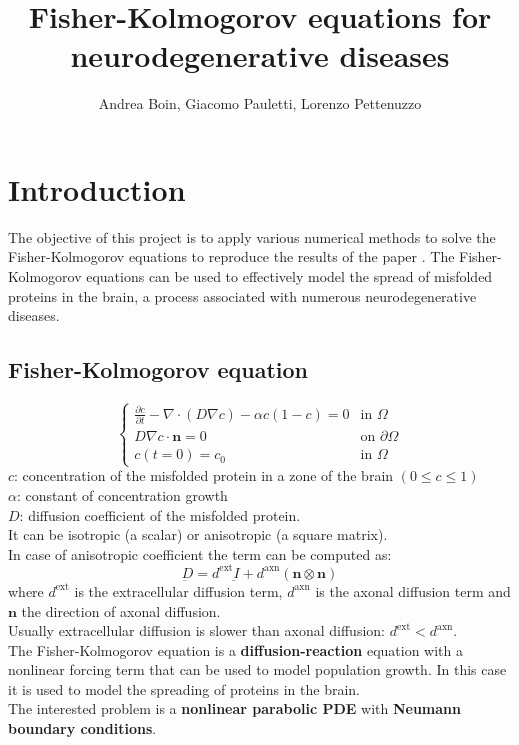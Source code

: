 \documentclass[12pt, letterpaper]{article}
\title{Fisher-Kolmogorov equations for neurodegenerative diseases}
\author{Andrea Boin, Giacomo Pauletti, Lorenzo Pettenuzzo}
\date{}
\begin{document}
\maketitle
\pagebreak

\tableofcontents
\pagebreak

\section{Introduction}
The objective of this project is to apply various numerical methods to solve the Fisher-Kolmogorov equations to reproduce the results of the paper \cite{diffusion-paper}. The Fisher-Kolmogorov equations can be used to effectively model the spread of misfolded proteins in the brain, a process associated with numerous neurodegenerative diseases.

\subsection{Fisher-Kolmogorov equation}
\[
\begin{cases}
\displaystyle \frac{\partial c}{\partial t} - \nabla \cdot (D \nabla c) - \alpha c(1 - c) = 0 & \text{in } \Omega\\
\displaystyle D \nabla c \cdot \mathbf{n} = 0 & \text{on } \partial \Omega\\
c(t=0)=c_0 & \text{in } \Omega
\end{cases}
\]
$c$: concentration of the misfolded protein in a zone of the brain $(0\leq c\leq1)$\\
$\alpha$: constant of concentration growth\\
$D$: diffusion coefficient of the misfolded protein.\\
It can be isotropic (a scalar) or anisotropic (a square matrix).\\
In case of anisotropic coefficient the term can be computed as:
$$\underbar{D}=d^{\text{ext}}\underbar{I}+d^{\text{axn}}(\mathbf{n}\otimes\mathbf{n})$$
where $d^{\text{ext}}$ is the extracellular diffusion term, $d^{\text{axn}}$ is the axonal diffusion term and $\mathbf{n}$ the direction of axonal diffusion.\\
Usually extracellular diffusion is slower than axonal diffusion: $d^{\text{ext}}<d^{\text{axn}}$.\\
The Fisher-Kolmogorov equation is a \textbf{diffusion-reaction} equation with a nonlinear forcing term that can be used to model population growth. In this case it is used to model the spreading of proteins in the brain.\\
The interested problem is a \textbf{nonlinear parabolic PDE} with \textbf{Neumann boundary conditions}. 
\pagebreak
\end{document}
